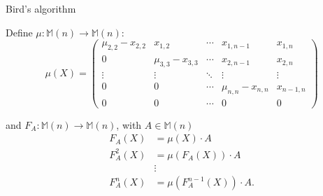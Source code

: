 \documentclass[handout]{beamer}
\begin{document}
\begin{frame}{Bird's algorithm}

    Define $\mu : \mathbb{M}(n) \to \mathbb{M}(n)$:
    \[
        \mu(X) =
        \begin{pmatrix}{}
            \mu_{2,2} - x_{2,2} & x_{1,2}             & \cdots & x_{1,n-1}           & x_{1,n} \\
            0                   & \mu_{3,3} - x_{3,3} & \cdots & x_{2,n-1}           & x_{2,n} \\
            \vdots              & \vdots              & \ddots & \vdots              & \vdots \\
            0                   & 0                   & \cdots & \mu_{n,n} - x_{n,n} & x_{n-1,n} \\
            0                   & 0                   & \cdots & 0                   & 0
        \end{pmatrix}
    \]

    \pause{}

    and $F_A : \mathbb{M}(n) \to \mathbb{M}(n)$,
    with $A \in \mathbb{M}(n)$
    \begin{align*}{}
        F_A(X)    & = \mu(X)\cdot A \\
        F_A^2(X)  & = \mu(F_A(X)) \cdot A \\
                  & \vdots \\
        F_A^n(X)  & = \mu(F_A^{n-1}(X)) \cdot A. \\
    \end{align*}

\end{frame}
\end{document}

